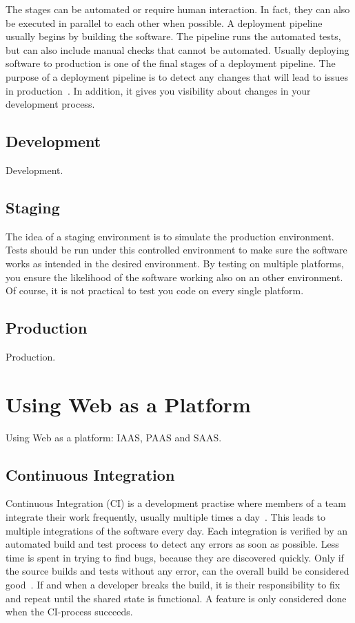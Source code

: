 \documentclass[english]{tktltiki2}
\begin{document}
The stages can be automated or require human interaction. In fact, they can also be executed in parallel to each other when possible. A deployment pipeline usually begins by building the software. The pipeline runs the automated tests, but can also include manual checks that cannot be automated. Usually deploying software to production is one of the final stages of a deployment pipeline. The purpose of a deployment pipeline is to detect any changes that will lead to issues in production~\cite{Fow13b}. In addition, it gives you visibility about changes in your development process.

\subsection{Development}

Development.

\subsection{Staging}

The idea of a staging environment is to simulate the production environment. Tests should be run under this controlled environment to make sure the software works as intended in the desired environment. By testing on multiple platforms, you ensure the likelihood of the software working also on an other environment. Of course, it is not practical to test you code on every single platform.

\subsection{Production}

Production.


\section{Using Web as a Platform}

Using Web as a platform: IAAS, PAAS and SAAS.

\subsection{Continuous Integration}

Continuous Integration (CI) is a development practise where members of a team integrate their work frequently, usually multiple times a day~\cite{Fow06}. This leads to multiple integrations of the software every day. Each integration is verified by an automated build and test process to detect any errors as soon as possible. Less time is spent in trying to find bugs, because they are discovered quickly. Only if the source builds and tests without any error, can the overall build be considered good~\cite{Fow06}. If and when a developer breaks the build, it is their responsibility to fix and repeat until the shared state is functional. A feature is only considered done when the CI-process succeeds.
\end{document}
